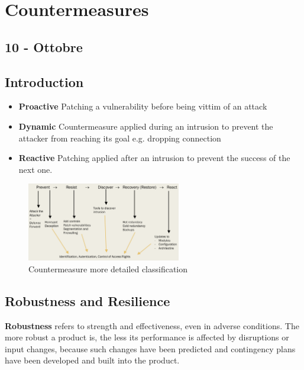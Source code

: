 \chapter{Countermeasures}
\section*{10 - Ottobre}
\section{Introduction}
\begin{itemize}
    \item \textbf{Proactive} Patching a vulnerability before being vittim of an attack
    \item \textbf{Dynamic} Countermeasure applied during an intrusion to prevent the attacker from reaching its goal e.g. dropping connection
    \item \textbf{Reactive} Patching applied after an intrusion to prevent the success of the next one.
\end{itemize}

\begin{figure}[h]
    \centering
    \includegraphics[width=0.6\textwidth]{images/countermeasure_classification.png}
    \caption{Countermeasure more detailed classification}
    \label{fig:countermeasures_classification}
\end{figure}

\section{Robustness and Resilience}
\textbf{Robustness} refers to strength and effectiveness, even in adverse
conditions. The more robust a product is, the less its performance is
affected by disruptions or input changes, because such changes have
been predicted and contingency plans have been developed and built
into the product.

